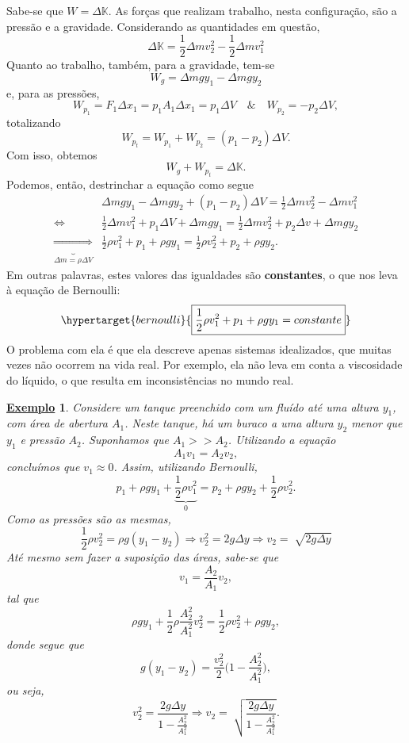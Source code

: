 \documentclass{article}
\newtheorem{example}{\underline{Exemplo}}
\begin{document}
Sabe-se que \(W = \Delta \mathbb{K}\). As forças que realizam trabalho, nesta configuração, são a pressão e a gravidade. Considerando as quantidades em questão, 
\[
  \Delta \mathbb{K} = \frac{1}{2}\Delta m v_{2}^{2} - \frac{1}{2}\Delta m v_{1}^{2}
\]
Quanto ao trabalho, também, para a gravidade, tem-se
\[
  W_{g} = \Delta mgy_{1} - \Delta mgy_{2}
\]
e, para as pressões, 
\[
  W_{p_{1}} = F_{1}\Delta x_{1} = p_{1}A_{1}\Delta x_{1} = p_{1}\Delta V\quad\&\quad W_{p_{2}} = -p_{2}\Delta V,
\]
totalizando 
\[
  W_{p_{t}} = W_{p_{1}} + W_{p_{2}} = (p_{1}-p_{2})\Delta V.
\]
Com isso, obtemos 
\[
  W_{g}+W_{p_{t}} = \Delta \mathbb{K}.
\]
Podemos, então, destrinchar a equação como segue
\begin{align*}
   &\Delta mgy_{1}-\Delta mgy_{2} + (p_{1}-p_{2})\Delta V = \frac{1}{2}\Delta mv_{2}^{2}-\Delta mv_{1}^{2}\\
  \Longleftrightarrow\quad  & \frac{1}{2}\Delta mv_{1}^{2} + p_{1}\Delta V + \Delta mgy_{1} = \frac{1}{2}\Delta mv_{2}^{2} + p_{2}\Delta v + \Delta mgy_{2}\\
  \underbrace{\Longrightarrow}_{\Delta m=\rho \Delta V}         & \frac{1}{2}\rho v_{1}^{2} + p_{1} + \rho gy_{1} = \frac{1}{2}\rho v_{2}^{2} + p_{2} + \rho gy_{2}.
\end{align*}
Em outras palavras, estes valores das igualdades são \textbf{constantes}, o que nos leva à equação de Bernoulli: 
\[
  \hypertarget{bernoulli}{\boxed{\frac{1}{2}\rho v_{1}^{2}+p_{1}+\rho gy_{1}=constante}}
\]
O problema com ela é que ela descreve apenas sistemas idealizados, que muitas vezes não ocorrem na vida real. Por exemplo, 
ela não leva em conta a viscosidade do líquido, o que resulta em inconsistências no mundo real.
\begin{example}
  Considere um tanque preenchido com um fluído até uma altura \(y_{1}\), com área de abertura \(A_{1}\). Neste tanque, há um buraco
  a uma altura \(y_{2}\) menor que \(y_{1}\) e pressão \(A_{2}\). Suponhamos que \(A_{1}>> A_{2}\). Utilizando a equação 
  \[
    A_{1}v_{1} = A_{2}v_{2},
  \]
  concluímos que \(v_{1}\approx0\). Assim, utilizando Bernoulli, 
  \[
    p_{1} + \rho gy_{1} + \underbrace{\frac{1}{2}\rho v_{1}^{2}}_{0} = p_{2} + \rho gy_{2} + \frac{1}{2}\rho v_{2}^{2}. 
  \]
  Como as pressões são as mesmas, 
  \[
    \frac{1}{2}\rho v_{2}^{2} = \rho g(y_{1}-y_{2}) \Rightarrow v_{2}^{2} = 2g\Delta y \Rightarrow v_{2}=\sqrt[]{2g\Delta y}
  \]
  Até mesmo sem fazer a suposição das áreas, sabe-se que 
  \[
    v_{1} = \frac{A_{2}}{A_{1}}v_{2},
  \]
  tal que 
  \[
    \rho gy_{1} + \frac{1}{2}\rho \frac{A_{2}^{2}}{A_{1}^{2}}v_{2}^{2} = \frac{1}{2}\rho v_{2}^{2} + \rho gy_{2},
  \]
  donde segue que 
  \[
    g(y_{1}-y_{2}) = \frac{v_{2}^{2}}{2}\biggl(1-\frac{A_{2}^{2}}{A_{1}^{2}}\biggr),
  \]
  ou seja, 
  \[
    v_{2}^{2} = \frac{2g\Delta y}{1-\frac{A_{2}^{2}}{A_{1}^{2}}} \Rightarrow v_{2} = \sqrt[]{\frac{2g\Delta y}{1-\frac{A_{2}^{2}}{A_{1}^{2}}}}.
  \]
\end{example}
\end{document}

